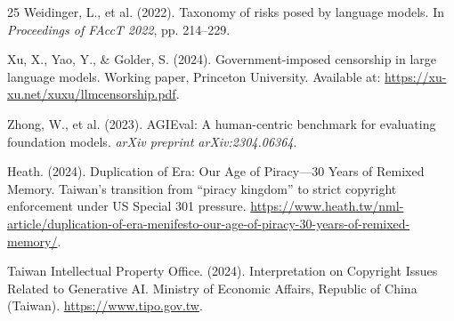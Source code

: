 \documentclass[11pt,a4paper]{article}
\begin{document}
\begin{thebibliography}{25}
Weidinger, L., et al. (2022).
\newblock Taxonomy of risks posed by language models.
\newblock In \textit{Proceedings of FAccT 2022}, pp. 214--229.

Xu, X., Yao, Y., \& Golder, S. (2024).
\newblock Government-imposed censorship in large language models.
\newblock Working paper, Princeton University.
\newblock Available at: \url{https://xu-xu.net/xuxu/llmcensorship.pdf}.

Zhong, W., et al. (2023).
\newblock AGIEval: A human-centric benchmark for evaluating foundation models.
\newblock \textit{arXiv preprint arXiv:2304.06364}.

Heath. (2024).
\newblock Duplication of Era: Our Age of Piracy---30 Years of Remixed Memory.
\newblock Taiwan's transition from ``piracy kingdom'' to strict copyright enforcement under US Special 301 pressure.
\newblock \url{https://www.heath.tw/nml-article/duplication-of-era-menifesto-our-age-of-piracy-30-years-of-remixed-memory/}.

Taiwan Intellectual Property Office. (2024).
\newblock Interpretation on Copyright Issues Related to Generative AI.
\newblock Ministry of Economic Affairs, Republic of China (Taiwan).
\newblock \url{https://www.tipo.gov.tw}.

\end{thebibliography}
\end{document}
